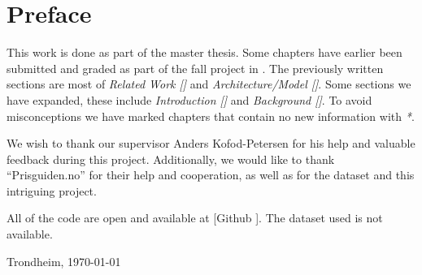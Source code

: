 \section*{Preface}



\vspace{1cm}

This work is done as part of the master thesis. Some chapters have earlier been submitted and graded
as part of the fall project in \cite{Sivertsen2021}.
The previously written sections are most of
\textit{Related Work []} and \textit{Architecture/Model []}.
Some sections we have expanded, these include \textit{Introduction [] } and
\textit{Background []}.
To avoid misconceptions we have marked chapters that contain no new
information with \textit{*}.


We wish to thank our supervisor Anders Kofod-Petersen for his help and valuable feedback during this project.
Additionally, we would like to thank ``Prisguiden.no'' for their help and cooperation,
as well as for the dataset and this intriguing project.

All of the code are open and available at [Github \cite{githubSource}]. The dataset used is not available.

\vfill

\hfill \thesisAuthor

\hfill Trondheim, \today
